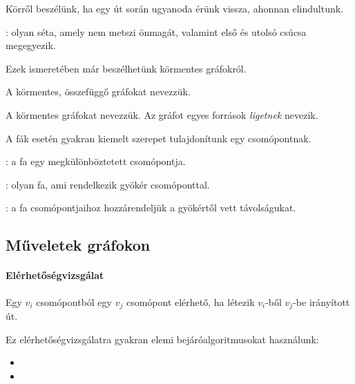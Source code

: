 Körről beszélünk, ha egy út során ugyanoda érünk vissza, ahonnan elindultunk.

\begin{definicio}
: olyan séta, amely nem metszi önmagát, valamint első és utolsó csúcsa megegyezik.
\end{definicio}

Ezek ismeretében már beszélhetünk körmentes gráfokról.

\begin{definicio}
	A körmentes, összefüggő gráfokat  nevezzük.
\end{definicio}

\begin{definicio}
	A körmentes gráfokat  nevezzük. Az  gráfot egyes források \emph{ligetnek} nevezik.
\end{definicio}

A fák esetén gyakran kiemelt szerepet tulajdonítunk egy csomópontnak.

\begin{definicio}
	: a fa egy megkülönböztetett csomópontja.
\end{definicio}

\begin{definicio}
	: olyan fa, ami rendelkezik gyökér csomóponttal.
\end{definicio}

\begin{definicio}
	: a fa csomópontjaihoz hozzárendeljük a gyökértől vett távolságukat.
\end{definicio}

\subsection{Műveletek gráfokon}

\paragraph{Elérhetőségvizsgálat}

Egy $v_i$ csomópontból egy $v_j$ csomópont elérhető, ha létezik $v_i$-ből $v_j$-be irányított út.

Ez elérhetőségvizsgálatra gyakran elemi bejáróalgoritmusokat használunk:

\begin{itemize}
\item {}
\item {}
\end{itemize}

